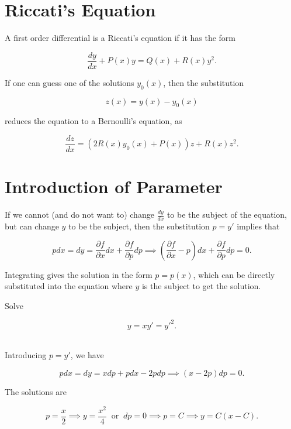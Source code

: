 \documentclass[english,a4paper,12pt]{report}
\begin{document}
\section{Riccati's Equation}

A first order differential is a Riccati's equation if it has the form

\begin{equation}
    \frac{dy}{dx} + P(x)y = Q(x) + R(x)y^2.
\end{equation}

If one can guess one of the solutions \(y_0 (x)\), then the substitution

\begin{equation}
    z(x) = y(x) - y_0(x)
\end{equation}

reduces the equation to a Bernoulli's equation, as

\begin{equation}
    \frac{dz}{dx} = (2R(x)y_0 (x)+P(x))z + R(x)z^2. 
\end{equation}

\section{Introduction of Parameter}

If we cannot (and do not want to) change \(\displaystyle \frac{dy}{dx} \) to be the subject of the equation, but can change \(y\) to be the subject, then the substitution \(p =y'\) implies that 

\begin{equation}
    pdx = dy = \frac{\partial f}{\partial x} dx + \frac{\partial f}{\partial p} dp \implies \left( \frac{\partial f}{\partial x} -p \right)dx + \frac{\partial f}{\partial p} dp = 0.
\end{equation}

Integrating gives the solution in the form \(p = p(x)\), which can be directly substituted into the equation where \(y\) is the subject to get the solution.

{Solve

\begin{equation}
    y = xy'=y'^2.
\end{equation}~
}
{Introducing \(p = y'\), we have

\begin{equation}
    pdx = dy = xdp + pdx - 2pdp \implies (x-2p)dp = 0.
\end{equation}

The solutions are 

\begin{equation}
    p = \frac{x}{2} \implies y = \frac{x^2}{4} ~\text { or }~ dp = 0 \implies p = C \implies y = C(x-C).  
\end{equation}~
} 
\end{document}
